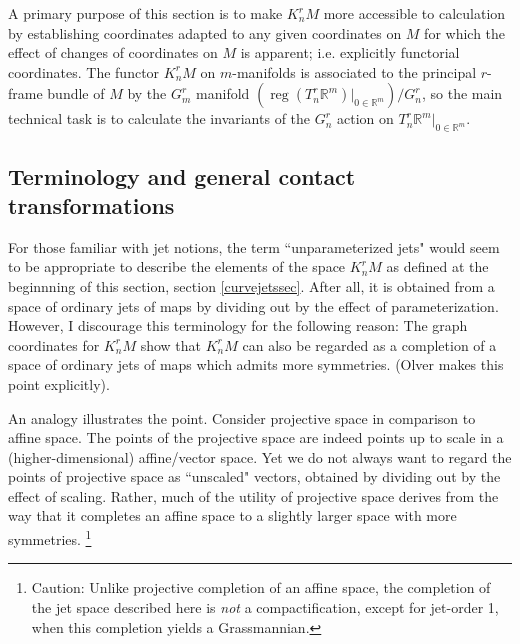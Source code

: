 \documentclass[12pt]{article}
\numberwithin{equation}{section}
\theoremstyle{plain}
\theoremstyle{definition}
\newcommand{\R}{\mathbb{R}}
\begin{document}
A primary purpose of this section is to make $K^{r}_{n}M$ more accessible to calculation by establishing coordinates adapted to any given coordinates on $M$ for which the effect of changes of coordinates on $M$ is apparent; i.e. explicitly functorial coordinates. The functor $K^{r}_{n}M$ on $m$-manifolds is associated to the principal $r$-frame bundle of $M$ by the $G^{r}_{m}$ manifold $(\operatorname{reg}(T^{r}_{n}\R^{m})|_{0\in \R^{m}})/G^{r}_{n}$, so the main technical task is to calculate the invariants of the $G^{r}_{n}$ action on $T^{r}_{n}\R^{m}|_{0\in \R^{m}}$.

\subsection{Terminology and general contact transformations}

For those familiar with jet notions, the term ``unparameterized jets" would seem to be appropriate to describe the elements of the space $K^{r}_{n}M$ as defined at the beginnning of this section, section \ref{curvejetssec}. After all, it is obtained from a space of ordinary jets of maps by dividing out by the effect of parameterization. However, I discourage this terminology for the following reason: The graph coordinates for $K^{r}_{n}M$ show that $K^{r}_{n}M$ can also be regarded as a completion of a space of ordinary jets of maps which admits more symmetries. (Olver \cite{olver} makes this point explicitly).

An analogy illustrates the point. Consider projective space in comparison to affine space. The points of the projective space are indeed points up to scale in a (higher-dimensional) affine/vector space. Yet we do not always want to regard the points of projective space as ``unscaled" vectors, obtained by dividing out by the effect of scaling. Rather, much of the utility of projective space derives from the way that it completes an affine space to a slightly larger space with more symmetries. \footnote{Caution: Unlike projective completion of an affine space, the completion of the jet space described here is \emph{not} a compactification, except for jet-order 1, when this completion yields a Grassmannian.}
\end{document}
